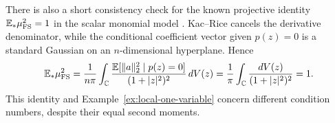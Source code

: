 There is also a short consistency check for the known projective identity
$\mathbb E_*\mu_{\mathrm{FS}}^2=1$ in the scalar monomial model
\cite{armentano2019polynomial}. Kac--Rice cancels the derivative denominator,
while the conditional coefficient vector given $p(z)=0$ is a standard
Gaussian on an $n$-dimensional hyperplane. Hence
\[
 \mathbb E_*\mu_{\mathrm{FS}}^2
 =\frac1{n\pi}\int_{\mathbb C}
    \frac{\mathbb E[\|a\|_2^2\mid p(z)=0]}{(1+|z|^2)^2}\,dV(z)
 =\frac1\pi\int_{\mathbb C}\frac{dV(z)}{(1+|z|^2)^2}=1.
\]
This identity and Example~\ref{ex:local-one-variable} concern different
condition numbers, despite their equal second moments.
